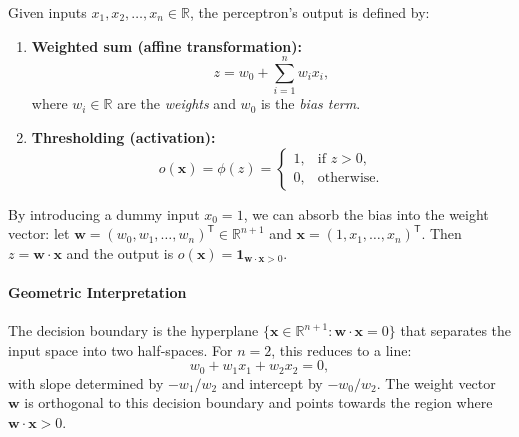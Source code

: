 \documentclass{tufte-handout}
\begin{document}
Given inputs $x_1, x_2, \dots, x_n \in \mathbb{R}$, the perceptron's output is defined by:
\begin{enumerate}
    \item \textbf{Weighted sum (affine transformation):}
    \begin{equation}
        z = w_0 + \sum_{i=1}^{n} w_i x_i,
    \end{equation}
    where $w_i \in \mathbb{R}$ are the \textit{weights} and $w_0$ is the \textit{bias term}.
    \item \textbf{Thresholding (activation):}
    \begin{equation}\label{eq:perceptron}
        o(\mathbf{x}) = \phi(z) = 
        \begin{cases}
            1, & \text{if } z > 0,\\
            0, & \text{otherwise}.
        \end{cases}
    \end{equation}
\end{enumerate}
By introducing a dummy input $x_0 = 1$, we can absorb the bias into the weight vector: let $\mathbf{w} = (w_0, w_1, \dots, w_n)^{\mathsf{T}} \in \mathbb{R}^{n+1}$ and $\mathbf{x} = (1, x_1, \dots, x_n)^{\mathsf{T}}$. Then $z = \mathbf{w} \cdot \mathbf{x}$ and the output is $o(\mathbf{x}) = \mathbf{1}_{\mathbf{w} \cdot \mathbf{x} > 0}$.

\paragraph{Geometric Interpretation}

The decision boundary is the hyperplane $\{\mathbf{x} \in \mathbb{R}^{n+1} : \mathbf{w} \cdot \mathbf{x} = 0\}$ that separates the input space into two half‑spaces. For $n = 2$, this reduces to a line:
\[
w_0 + w_1 x_1 + w_2 x_2 = 0,
\]
with slope determined by $-w_1/w_2$ and intercept by $-w_0/w_2$. The weight vector $\mathbf{w}$ is orthogonal to this decision boundary and points towards the region where $\mathbf{w} \cdot \mathbf{x} > 0$.
\end{document}
